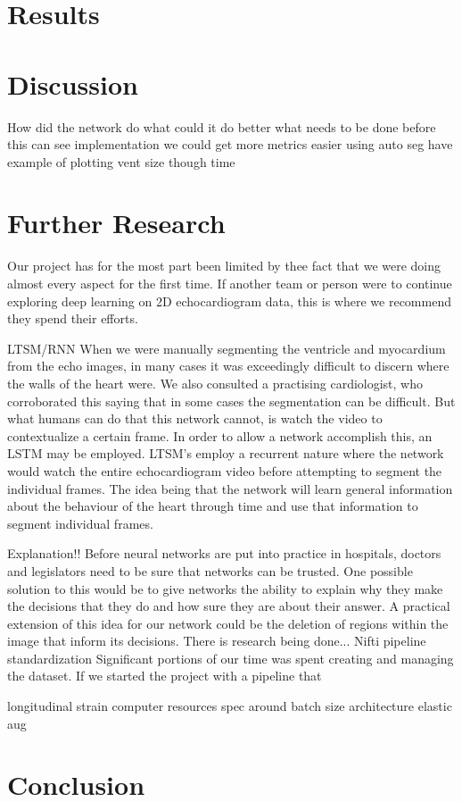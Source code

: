 \documentclass[12pt]{article}
\begin{document}
\section{Results}

\section{Discussion}
How did the network do
what could it do better
what needs to be done before this can see implementation
we could get more metrics easier using auto seg
have example of plotting vent size though time

\section{Further Research}
Our project has for the most part been limited by thee fact that we were doing almost every aspect for the first time.
If another team or person were to continue exploring deep learning on 2D echocardiogram data, this is where we recommend they spend their efforts.

LTSM/RNN
When we were manually segmenting the ventricle and myocardium from the echo images, in many cases it was exceedingly difficult to discern where the walls of the heart were.
We also consulted a practising cardiologist, who corroborated this saying that in some cases the segmentation can be difficult.
But what humans  can do that this network cannot, is watch the video to contextualize a certain frame.
In order to allow a network accomplish this, an LSTM may be employed.
LTSM's employ a recurrent nature where the network would watch the entire echocardiogram video before attempting to segment the individual frames.
The idea being that the network will learn general information about the behaviour of the heart through time and use that information to segment individual frames.

Explanation!!
Before neural networks are put into practice in hospitals, doctors and legislators need to be sure that networks can be trusted.
One possible solution to this would be to give networks the ability to explain why they make the decisions that they do and how sure they are about their answer.
A practical extension of this idea for our network could be the deletion of regions within the image that inform its decisions.
There is research being done...
Nifti pipeline standardization
Significant portions of our time was spent creating and managing the dataset.
If we started the project with a pipeline that 

longitudinal strain
computer resources
spec around batch size
architecture
elastic aug
\section{Conclusion}



%
\end{document}
